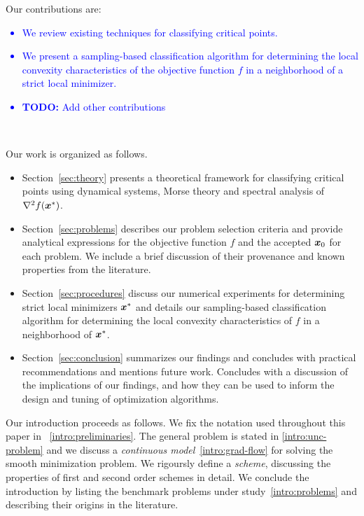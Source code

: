 \documentclass[10pt]{article}
\begin{document}
    \medskip

    Our contributions are:
    \textcolor{Blue}{
        \begin{itemize}
            \item We review existing techniques for classifying critical points.
            \item We present a sampling-based classification algorithm for determining the local convexity
            characteristics of the objective function $f$ in a neighborhood of a strict local minimizer.
            \item  \textbf{TODO:} Add other contributions
        \end{itemize}
    }\
    
    \medskip

    Our work is organized as follows.
    \begin{itemize}
        \item Section~\ref{sec:theory} presents a theoretical framework for classifying critical points
        using dynamical systems, Morse theory and spectral analysis of $\nabla^2 f(\bm{x}^*)$.
        \item Section~\ref{sec:problems} describes our problem selection criteria and 
        provide analytical expressions for the objective function $f$ and the
        accepted $\bm{x}_0$ for each problem. We include a brief discussion of
        their provenance and known properties from the literature. 
        \item Section~\ref{sec:procedures} discuss our numerical experiments for determining
        strict local minimizers $\bm{x}^*$ and details our sampling-based classification algorithm
        for determining the local convexity characteristics of $f$ in a neighborhood of $\bm{x}^*$.
        \item Section~\ref{sec:conclusion} summarizes our findings and concludes with practical 
        recommendations and mentions future work. Concludes with a discussion of the implications of our findings,
        and how they can be used to inform the design and tuning of optimization algorithms.
    \end{itemize}

    Our introduction proceeds as follows. We fix the notation used throughout this 
    paper in ~\ref{intro:preliminaries}. The general problem is stated in \ref{intro:unc-problem}
    and we discuss a \emph{continuous model}~\ref{intro:grad-flow} for solving the smooth minimization
    problem. We rigoursly define a \emph{scheme}, discussing the properties of first and second order
    schemes in detail. We conclude the introduction by listing the benchmark problems 
    under study~\ref{intro:problems} and describing their origins in the literature.
\end{document}

